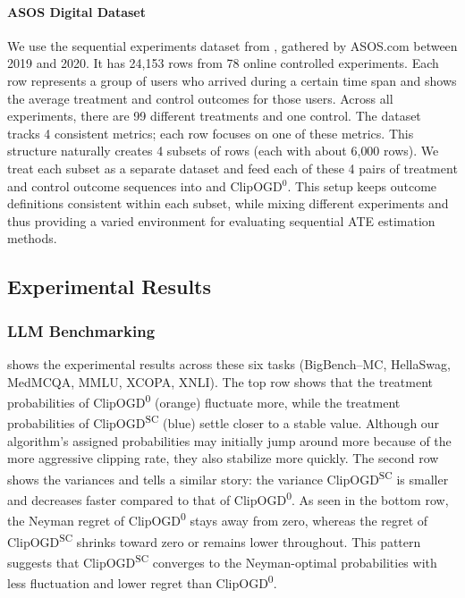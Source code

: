 \paragraph{ASOS Digital Dataset} 
We use the sequential experiments dataset from \citet{liu2021datasets}, gathered by ASOS.com between 2019 and 2020. It has 24{,}153 rows from 78 online controlled experiments. Each row represents a group of users who arrived during a certain time span and shows the average treatment and control outcomes for those users. Across all experiments, there are 99 different treatments and one control. The dataset tracks 4 consistent metrics; each row focuses on one of these metrics. This structure naturally creates 4 subsets of rows (each with about 6{,}000 rows). We treat each subset as a separate dataset and feed each of these 4 pairs of treatment and control outcome sequences into \ClipOGDSC and ClipOGD$^0$. This setup keeps outcome definitions consistent within each subset, while mixing different experiments and thus providing a varied environment for evaluating sequential ATE estimation methods.


\subsection{Experimental Results}

\subsubsection{LLM Benchmarking}

 shows the experimental results across these six tasks (BigBench–MC, HellaSwag, MedMCQA, MMLU, XCOPA, XNLI). The top row shows that the treatment probabilities of ClipOGD\textsuperscript{0} (orange) fluctuate more, while the treatment probabilities of ClipOGD\textsuperscript{SC} (blue) settle closer to a stable value. Although our algorithm's assigned probabilities may initially jump around more because of the more aggressive clipping rate, they also stabilize more quickly. The second row shows the variances and tells a similar story: the variance ClipOGD\textsuperscript{SC} is smaller and decreases faster compared to that of ClipOGD\textsuperscript{0}. As seen in the bottom row, the Neyman regret of ClipOGD\textsuperscript{0} stays away from zero, whereas the regret of ClipOGD\textsuperscript{SC} shrinks toward zero or remains lower throughout. This pattern suggests that ClipOGD\textsuperscript{SC} converges to the Neyman-optimal probabilities with less fluctuation and lower regret than ClipOGD\textsuperscript{0}.


